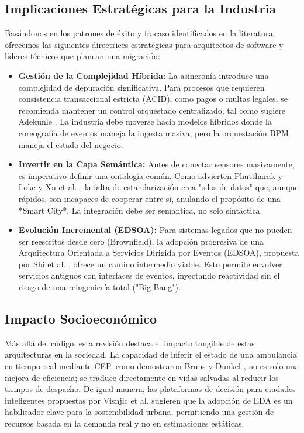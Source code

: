 \subsection{Implicaciones Estratégicas para la Industria}
Basándonos en los patrones de éxito y fracaso identificados en la literatura, ofrecemos las siguientes directrices estratégicas para arquitectos de software y líderes técnicos que planean una migración:

\begin{itemize}
    \item \textbf{Gestión de la Complejidad Híbrida:} La asincronía introduce una complejidad de depuración significativa. Para procesos que requieren consistencia transaccional estricta (ACID), como pagos o multas legales, se recomienda mantener un control orquestado centralizado, tal como sugiere Adekunle \cite{adekunle2024financial}. La industria debe moverse hacia modelos híbridos donde la coreografía de eventos maneja la ingesta masiva, pero la orquestación BPM maneja el estado del negocio.
    
    \item \textbf{Invertir en la Capa Semántica:} Antes de conectar sensores masivamente, es imperativo definir una ontología común. Como advierten Phuttharak y Loke \cite{phuttharak2023smartcity} y Xu et al. \cite{xu2016provisioning}, la falta de estandarización crea "silos de datos" que, aunque rápidos, son incapaces de cooperar entre sí, anulando el propósito de una *Smart City*. La integración debe ser semántica, no solo sintáctica.
    
    \item \textbf{Evolución Incremental (EDSOA):} Para sistemas legados que no pueden ser reescritos desde cero (Brownfield), la adopción progresiva de una Arquitectura Orientada a Servicios Dirigida por Eventos (EDSOA), propuesta por Shi et al. \cite{shi2015execution}, ofrece un camino intermedio viable. Esto permite envolver servicios antiguos con interfaces de eventos, inyectando reactividad sin el riesgo de una reingeniería total ("Big Bang").
\end{itemize}

\subsection{Impacto Socioeconómico}
Más allá del código, esta revisión destaca el impacto tangible de estas arquitecturas en la sociedad. La capacidad de inferir el estado de una ambulancia en tiempo real mediante CEP, como demostraron Bruns y Dunkel \cite{bruns2014fusion}, no es solo una mejora de eficiencia; se traduce directamente en vidas salvadas al reducir los tiempos de despacho. De igual manera, las plataformas de decisión para ciudades inteligentes propuestas por Visnjic et al. \cite{visnjic2021decision} sugieren que la adopción de EDA es un habilitador clave para la sostenibilidad urbana, permitiendo una gestión de recursos basada en la demanda real y no en estimaciones estáticas.

